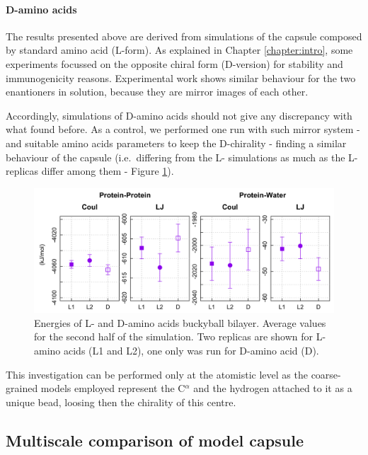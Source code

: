 \paragraph{D-amino acids} The results presented above are derived from simulations of the capsule composed by standard amino acid (L-form). As explained in Chapter \ref{chapter:intro}, some experiments focussed on the opposite chiral form (D-version) for stability and immunogenicity reasons. Experimental work shows similar behaviour for the two enantioners in solution, because they are mirror images of each other.

Accordingly, simulations of D-amino acids should not give any discrepancy with what found before. As a control, we performed one run with such mirror system - and suitable amino acids parameters to keep the D-chirality - finding a similar behaviour of the capsule (i.e.\ differing from the L- simulations as much as the L- replicas differ among them - Figure \ref{fig:D_aa}).

\begin{figure}[t]
\centering
\includegraphics[width=0.95\linewidth]{3results_capsule/pics/compare_D_L.png}
\caption[Energies of L- and D-amino acids buckyball bilayer (atomistic)]{Energies of L- and D-amino acids buckyball bilayer. Average values for the second half of the simulation. Two replicas are shown for L-amino acids (L1 and L2), one only was run for D-amino acid (D).}
\label{fig:D_aa}
\end{figure}

This investigation can be performed only at the atomistic level as the coarse-grained models employed represent the C$^\alpha$ and the hydrogen attached to it as a unique bead, loosing then the chirality of this centre.


\subsection{Multiscale comparison of model capsule} \label{sec:res_multiscale}

